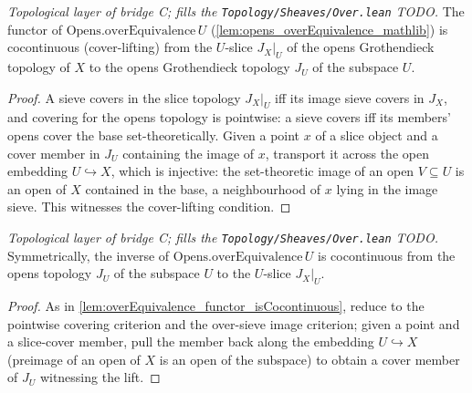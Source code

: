 \begin{lemma}
  \label{lem:overEquivalence_functor_isCocontinuous}
  \textit{Topological layer of bridge C; fills the \texttt{Topology/Sheaves/Over.lean} TODO.}
  The functor of \(\mathrm{Opens.overEquivalence}\,U\) (\cref{lem:opens_overEquivalence_mathlib})
  is cocontinuous (cover-lifting) from the \(U\)-slice \(J_X|_U\) of the opens Grothendieck
  topology of \(X\) to the opens Grothendieck topology \(J_U\) of the subspace \(U\).
\end{lemma}
\begin{proof}
  A sieve covers in the slice topology \(J_X|_U\) iff its image sieve covers in \(J_X\), and
  covering for the opens topology is pointwise: a sieve covers iff its members' opens cover the
  base set-theoretically. Given a point \(x\) of a slice object and a cover member in \(J_U\)
  containing the image of \(x\), transport it across the open embedding \(U \hookrightarrow X\),
  which is injective: the set-theoretic image of an open \(V \subseteq U\) is an open of \(X\)
  contained in the base, a neighbourhood of \(x\) lying in the image sieve. This witnesses the
  cover-lifting condition.
\end{proof}

\begin{lemma}
  \label{lem:overEquivalence_inverse_isCocontinuous}
  \textit{Topological layer of bridge C; fills the \texttt{Topology/Sheaves/Over.lean} TODO.}
  Symmetrically, the inverse of \(\mathrm{Opens.overEquivalence}\,U\) is cocontinuous from the
  opens topology \(J_U\) of the subspace \(U\) to the \(U\)-slice \(J_X|_U\).
\end{lemma}
\begin{proof}
  As in \cref{lem:overEquivalence_functor_isCocontinuous}, reduce to the pointwise covering
  criterion and the over-sieve image criterion; given a point and a slice-cover member, pull the
  member back along the embedding \(U \hookrightarrow X\) (preimage of an open of \(X\) is an open
  of the subspace) to obtain a cover member of \(J_U\) witnessing the lift.
\end{proof}

